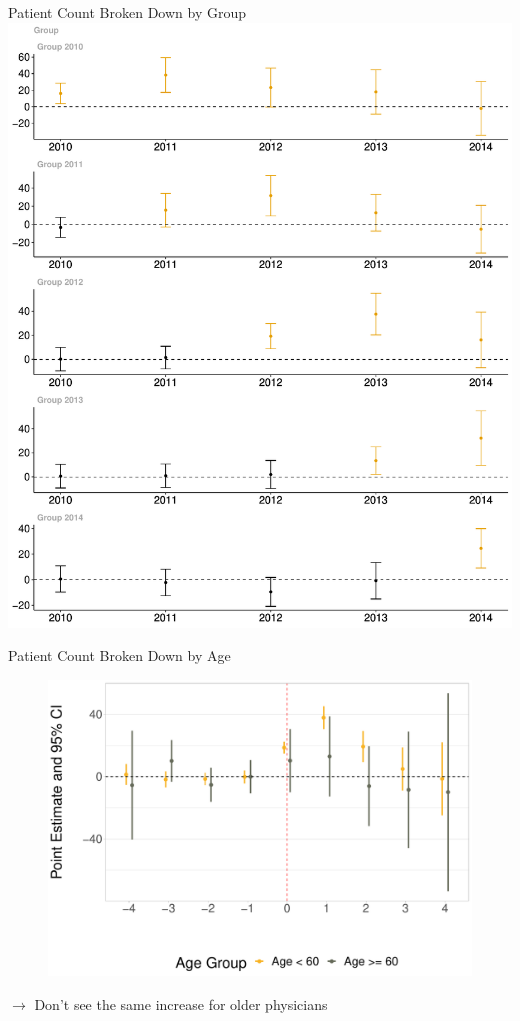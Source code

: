 \documentclass[10pt]{beamer}
\begin{document}
\begin{frame}{Patient Count Broken Down by Group}
\centering
    \includegraphics[scale=.25]{Objects/patient_group.pdf}
\end{frame}

\begin{frame}{Patient Count Broken Down by Age}
\begin{figure}[ht]
\centering
\includegraphics[scale=.4]{Objects/Presentation_patients_ages.pdf}
\end{figure}
$\rightarrow$ Don't see the same increase for older physicians
\end{frame}
\end{document}
